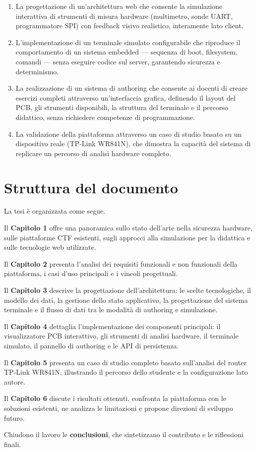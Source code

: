 \begin{enumerate}
    \item La progettazione di un'architettura web che consente la simulazione interattiva di strumenti di misura hardware (multimetro, sonde UART, programmatore SPI) con feedback visivo realistico, interamente lato client.

    \item L'implementazione di un terminale simulato configurabile che riproduce il comportamento di un sistema embedded --- sequenza di boot, filesystem, comandi --- senza eseguire codice sul server, garantendo sicurezza e determinismo.

    \item La realizzazione di un sistema di authoring che consente ai docenti di creare esercizi completi attraverso un'interfaccia grafica, definendo il layout del PCB, gli strumenti disponibili, la struttura del terminale e il percorso didattico, senza richiedere competenze di programmazione.

    \item La validazione della piattaforma attraverso un caso di studio basato su un dispositivo reale (TP-Link WR841N), che dimostra la capacità del sistema di replicare un percorso di analisi hardware completo.
\end{enumerate}

\section*{Struttura del documento}

La tesi è organizzata come segue.

Il \textbf{Capitolo 1} offre una panoramica sullo stato dell'arte nella sicurezza hardware, sulle piattaforme CTF esistenti, sugli approcci alla simulazione per la didattica e sulle tecnologie web utilizzate.

Il \textbf{Capitolo 2} presenta l'analisi dei requisiti funzionali e non funzionali della piattaforma, i casi d'uso principali e i vincoli progettuali.

Il \textbf{Capitolo 3} descrive la progettazione dell'architettura: le scelte tecnologiche, il modello dei dati, la gestione dello stato applicativo, la progettazione del sistema terminale e il flusso di dati tra le modalità di authoring e simulazione.

Il \textbf{Capitolo 4} dettaglia l'implementazione dei componenti principali: il visualizzatore PCB interattivo, gli strumenti di analisi hardware, il terminale simulato, il pannello di authoring e le API di persistenza.

Il \textbf{Capitolo 5} presenta un caso di studio completo basato sull'analisi del router TP-Link WR841N, illustrando il percorso dello studente e la configurazione lato autore.

Il \textbf{Capitolo 6} discute i risultati ottenuti, confronta la piattaforma con le soluzioni esistenti, ne analizza le limitazioni e propone direzioni di sviluppo futuro.

Chiudono il lavoro le \textbf{conclusioni}, che sintetizzano il contributo e le riflessioni finali.
